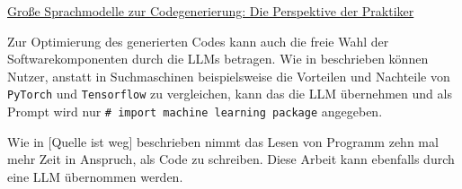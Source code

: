 \href{https://arxiv.org/html/2501.16998v1}{Große Sprachmodelle zur Codegenerierung: Die Perspektive der Praktiker}

Zur Optimierung des generierten Codes kann auch die freie Wahl der Softwarekomponenten durch die LLMs betragen. Wie in \cite{chen-2021} beschrieben können Nutzer, anstatt in Suchmaschinen beispielsweise die Vorteilen und Nachteile von \texttt{PyTorch} und \texttt{Tensorflow} zu vergleichen, kann das die LLM übernehmen und als Prompt wird nur \texttt{\# import machine learning package} angegeben.\vspace{0.2cm}

Wie in [Quelle ist weg] beschrieben nimmt das Lesen von Programm zehn mal mehr Zeit in Anspruch, als Code zu schreiben. Diese Arbeit kann ebenfalls durch eine LLM übernommen werden.